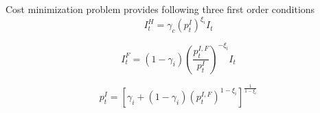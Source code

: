 \documentclass[11pt,titlepage]{article}
\begin{document}
Cost minimization problem provides following three first order conditions \\
\begin{equation}
I_t^H = \gamma_c \left({p_t^{I}}  \right) ^{\xi_i} I_t
\end{equation}

\begin{equation} I_t^F = (1-\gamma_i ) \left(\frac{p_t^{I,F}}{p_t^I}  \right) ^{-\xi_i} I_t \end{equation}

\begin{equation}p_t^I = \left[ \gamma_i  +(1-\gamma_i) {(p_t^{I,F})}^{{1-\xi_i}}  \right]  ^{\frac{1}{1-\xi_i}} \end{equation}


\small
\end{document}
